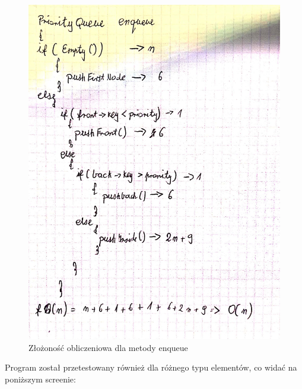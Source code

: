 \documentclass{article}
\begin{document}
\begin{figure}[H]
    \centering
    \hspace*{-1cm}
    \includegraphics[totalheight=8cm]{zlozonosc.jpg}
    \caption{Złożoność obliczeniowa dla metody enqueue}
    \label{2}
\end{figure}

Program został przetestowany również dla różnego typu elementów, co widać na 
poniższym screenie:
\end{document}
